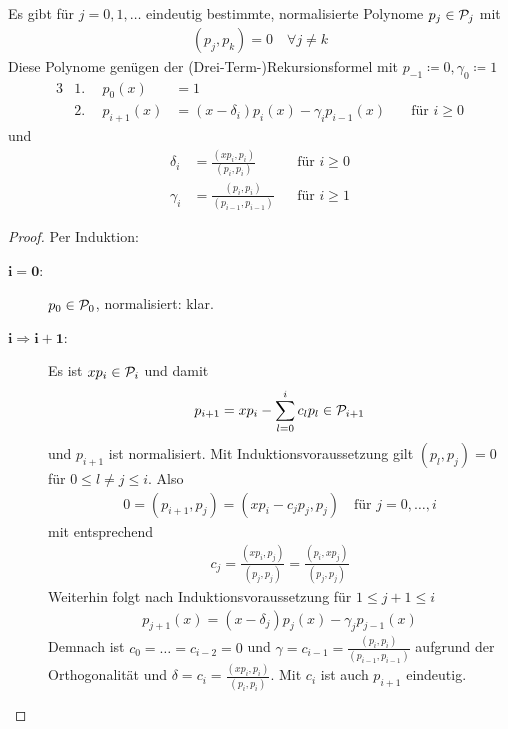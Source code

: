 \begin{Satze}\label{7.4.4}
  Es gibt für $j=0,1,\ldots$ eindeutig bestimmte, normalisierte
  Polynome $p_j\in\mathcal{P}_j$ mit 
  \begin{gather*}
    (p_j,p_k) =0 \quad \forall j\neq k
  \end{gather*}
  Diese Polynome genügen der (Drei-Term-)Rekursionsformel 
   mit 
  $p_{-1}\coloneqq 0, \gamma_0\coloneqq 1$
  \begin{alignat}{3}
    \nonumber
    &1.~~&p_0(x)&=1 \\
    &2.~~&p_{i+1}(x)&=(x-\delta_i)p_i(x)-\gamma_ip_{i-1}(x)
    &\quad \text{für  }i\geq 0
    \label{VII.4.3} 
  \end{alignat}
  und
  \begin{align}
    \nonumber
    \delta_i &=\frac{(xp_i,p_i)}{(p_i,p_i)}
    &&\text{für }i\geq 0 \\
    \gamma_i &=\frac{(p_i,p_i)}{(p_{i-1},p_{i-1})}
    &&\text{für }i\geq 1
       \label{VII.4.4}     
  \end{align}

  \begin{proof}
    Per Induktion:
    \begin{description}
    \item[$\boldsymbol{i=0}$:] $p_0\in\mathcal{P}_0$, normalisiert: klar.
    \item[$\boldsymbol{i\Rightarrow i+1}$:]  Es ist $xp_i\in\mathcal{P}_i$
      und damit
      \begin{gather*}
        p_{i+1}=xp_i-\sum_{l=0}^ic_lp_l\in\mathcal{P}_{i+1}
      \end{gather*}
      und $p_{i+1}$ ist normalisiert.
      Mit Induktionsvoraussetzung gilt $(p_l,p_j)=0$ 
      für $0\leq l\neq j\leq i$. Also 
      \begin{gather*}
        0=(p_{i+1},p_j) = (xp_i-c_jp_j, p_j) \quad \text{für } j=0,\ldots, i
      \end{gather*}
      mit entsprechend 
      \begin{gather*}
        c_j=\frac{(xp_i,p_j)}{(p_j,p_j)} = \frac{(p_i,xp_j)}{(p_j,p_j)}
      \end{gather*}
      Weiterhin folgt nach Induktionsvoraussetzung für $1\leq j+1\leq i$
      \begin{gather*}
        p_{j+1}(x)=(x-\delta_j)p_j(x) -\gamma_jp_{j-1}(x)
      \end{gather*}
      Demnach ist $c_0=\ldots=c_{i-2}=0$ und
      $\gamma=c_{i-1}=\frac{(p_i,p_i)}{(p_{i-1},p_{i-1})}$
      aufgrund der Orthogonalität
      und $\delta=c_i=\frac{(xp_i,p_i)}{(p_i,p_i)}$.
      Mit $c_i$ ist auch $p_{i+1}$ eindeutig.
    \end{description}
  \end{proof}
\end{Satze}

